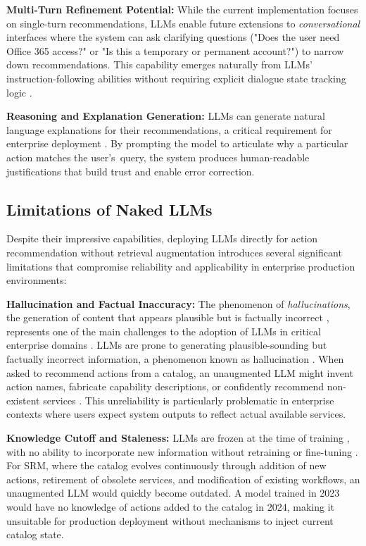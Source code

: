 \textbf{Multi-Turn Refinement Potential:} While the current implementation focuses on single-turn recommendations, LLMs enable future extensions to \textit{conversational} interfaces where the system can ask clarifying questions ("Does the user need Office 365 access?" or "Is this a temporary or permanent account?") to narrow down recommendations. This capability emerges naturally from LLMs' instruction-following abilities without requiring explicit dialogue state tracking logic \cite{recommender_systems_llm} \cite{openai2024gpt4technicalreport}.

\textbf{Reasoning and Explanation Generation:} LLMs can generate natural language explanations for their recommendations, a critical requirement for enterprise deployment \cite{madabhushini2025explainable}. By prompting the model to articulate why a particular action matches the user's~query, the system produces human-readable justifications that build trust and enable error correction.

\subsection{Limitations of Naked LLMs}

Despite their impressive capabilities, deploying LLMs directly for action recommendation without retrieval augmentation introduces several significant limitations that compromise reliability and applicability in enterprise production environments:

\textbf{Hallucination and Factual Inaccuracy:} The phenomenon of \textit{hallucinations}, the generation of content that appears plausible but is factually incorrect \cite{Huang_2025}, represents one of the main challenges to the adoption of LLMs in critical enterprise domains \cite{Huang_2025}. LLMs are prone to generating plausible-sounding but factually incorrect information, a phenomenon known as hallucination \cite{Ji_2023}\cite{Huang_2025}. When asked to recommend actions from a catalog, an unaugmented LLM might invent action names, fabricate capability descriptions, or confidently recommend non-existent services \cite{Huang_2025}. This unreliability is particularly problematic in enterprise contexts where users expect system outputs to reflect actual available services.

\textbf{Knowledge Cutoff and Staleness:} LLMs are frozen at the time of training \cite{lewis2021retrievalaugmentedgenerationknowledgeintensivenlp}, with no ability to incorporate new information without retraining or fine-tuning \cite{lewis2021retrievalaugmentedgenerationknowledgeintensivenlp}. For SRM, where the catalog evolves continuously through addition of new actions, retirement of obsolete services, and modification of existing workflows, an unaugmented LLM would quickly become outdated. A model trained in 2023 would have no knowledge of actions added to the catalog in 2024, making it unsuitable for production deployment without mechanisms to inject current catalog state.

